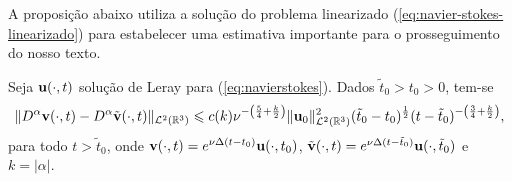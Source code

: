 A proposição abaixo utiliza a solução do problema linearizado (\ref{eq:navier-stokes-linearizado}) para estabelecer uma estimativa importante para o prosseguimento do nosso texto.

\begin{pbox} \label{pr:dav}
    Seja $\mathbf{u}(\cdot,t)$ solução de Leray para (\ref{eq:navierstokes}).
    Dados $\tilde t_0 > t_0 > 0$, tem-se
    \[
        \Vert D^\alpha \mathbf{v}(\cdot,t) - D^\alpha \tilde {\mathbf{v}}(\cdot,t)\Vert_{\mathcal{L}^2(\mathbb{R}^3)} \leqslant c(k) \nu^{-\left( \frac{5}{4} + \frac{k}{2} \right)} \Vert \mathbf{u}_0 \Vert_{\mathcal{L}^2(\mathbb{R}^3)}^2 (\tilde t_0 - t_0)^{\frac{1}{2}} (t - \tilde t_0)^{-\left( \frac{3}{4} + \frac{k}{2} \right)},
    \]
    para todo $t > \tilde t_0$, onde $\mathbf{v}(\cdot,t) = e^{\nu\Delta(t-t_0)} \mathbf{u}(\cdot,t_0)$, $\tilde{\mathbf{v}}(\cdot,t) = e^{\nu\Delta(t-\tilde t_0)} \mathbf{u}(\cdot,\tilde t_0)$ e $k = |\alpha|$.
\end{pbox}
